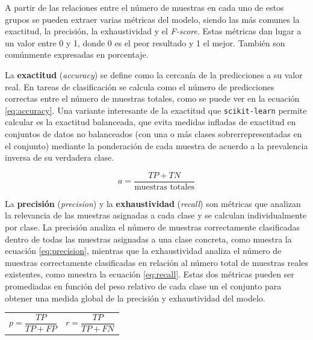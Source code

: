 A partir de las relaciones entre el número de muestras en cada uno de estos grupos se pueden extraer varias métricas del modelo, siendo las más comunes la exactitud, la precisión, la exhaustividad y el \emph{F-score}\cite{scikit-model-eval}. Estas métricas dan lugar a un valor entre 0 y 1, donde 0 es el peor resultado y 1 el mejor. También son comúnmente expresadas en porcentaje.

La \textbf{exactitud} (\emph{accuracy}) se define como la cercanía de la predicciones a su valor real. En tareas de clasificación se calcula como el número de predicciones correctas entre el número de muestras totales, como se puede ver en la ecuación \ref{eq:accuracy}. Una variante interesante de la exactitud que \texttt{scikit-learn} permite calcular es la exactitud balanceada, que evita medidas infladas de exactitud en conjuntos de datos no balanceados (con una o más clases sobrerrepresentadas en el conjunto) mediante la ponderación de cada muestra de acuerdo a la prevalencia inversa de su verdadera clase.

\begin{equation}
    a = \dfrac{TP+TN}{\text{muestras totales}}
\label{eq:accuracy}
\end{equation}

La \textbf{precisión} (\emph{precision}) y la \textbf{exhaustividad} (\emph{recall}) son métricas que analizan la relevancia de las muestras asignadas a cada clase y se calculan individualmente por clase. La precisión analiza el número de muestras correctamente clasificadas dentro de todas las muestras asignadas a una clase concreta, como muestra la ecuación \ref{eq:precision}, mientras que la exhaustividad analiza el número de muestras correctamente clasificadas en relación al número total de muestras reales existentes, como muestra la ecuación \ref{eq:recall}. Estas dos métricas pueden ser promediadas en función del peso relativo de cada clase un el conjunto para obtener una medida global de la precisión y exhaustividad del modelo.

\noindent
\begin{tabular}{@{}p{.4\linewidth}@{}p{.6\linewidth}@{}}
  \begin{equation}
     p = \dfrac{TP}{TP + FP}
  \label{eq:precision}
  \end{equation}
  &
  \begin{equation}
    r = \dfrac{TP}{TP + FN}
  \label{eq:recall}
  \end{equation}
\end{tabular}

